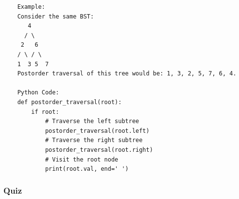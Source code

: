 \documentclass{article}
\begin{document}
\begin{verbatim}
    Example:
    Consider the same BST:
       4
      / \
     2   6
    / \ / \
    1  3 5  7
    Postorder traversal of this tree would be: 1, 3, 2, 5, 7, 6, 4.

    Python Code:
    def postorder_traversal(root):
        if root:
            # Traverse the left subtree
            postorder_traversal(root.left)
            # Traverse the right subtree
            postorder_traversal(root.right)
            # Visit the root node
            print(root.val, end=' ')
\end{verbatim}


\subsubsection{Quiz}
\end{document}
